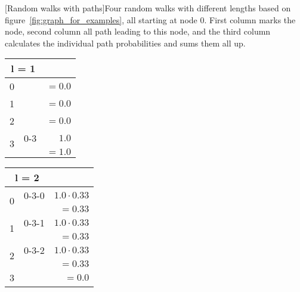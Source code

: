 
    \centering
    [Random walks with paths]{Four random walks with different lengths based on figure~\ref{fig:graph_for_examples}, all starting at node 0. First column marks the node, second column all path leading to this node, and the third column calculates the individual path probabilities and sums them all up.}\label{tbl:RW}
\footnotesize
\begin{multicols}{2}
\begin{tabular}{lcr}
\toprule
\multicolumn{2}{c}{l = 1}&\phantom{$1.0 \cdot 0.33 \cdot 0.5 \cdot 0.33$}\\
\midrule
0	&						&$=0.0$\\
\hline
1	&				 		&$=0.0$\\
\hline
2	&					 	&$=0.0$\\
\hline
\multirow{2}{*}{3}&0-3				 	&$1.0$\\
	&\phantom{0-3-2-3-2}						&$=1.0$\\
\bottomrule
\end{tabular}

\vspace*{1em}

\begin{tabular}{lcr}
\toprule
\multicolumn{2}{c}{l = 2}&\phantom{$1.0 \cdot 0.33 \cdot 0.5 \cdot 0.33$}\\\midrule
\multirow{2}{*}{0}&0-3-0			&$1.0 \cdot 0.33$\\
	&					&$=0.33$\\
\hline
\multirow{2}{*}{1}&0-3-1	 		&$1.0 \cdot 0.33$\\
	&					&$=0.33$\\
\hline
\multirow{2}{*}{2}&0-3-2		 	&$1.0 \cdot 0.33$\\
	&					&$=0.33$\\
\hline
3	&\phantom{0-3-2-3-2}					 &$=0.0$\\
\bottomrule
\end{tabular}

\vspace*{1em}


\end{multicols}
